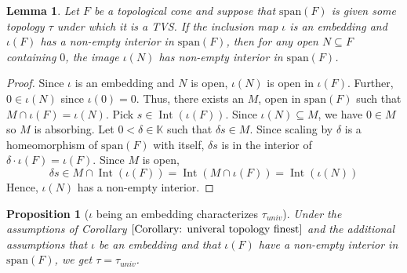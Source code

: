 \documentclass[a4paper,11pt]{article}
\numberwithin{equation}{section}
\theoremstyle{definition}
\theoremstyle{plain}
\newtheorem{Proposition}[Definition]{Proposition}
\newtheorem{Lemma}[Definition]{Lemma}
\newcommand{\spn}{\mathrm{span}}
\DeclareMathOperator{\Int}{Int}
\begin{document}
\begin{Lemma}\label{Lemma: Image has non empty interior}
    Let $F$ be a topological cone and suppose that $\spn(F)$ is given some topology $\tau$ under which it is a TVS. If the inclusion map $\iota$ is an embedding and $\iota(F)$ has a non-empty interior in $\spn(F)$, then for any open $N \subseteq F$ containing $0$, the image $\iota(N)$ has non-empty interior in $\spn(F)$.
\end{Lemma}
\begin{proof}
    Since $\iota$ is an embedding and $N$ is open, $\iota(N)$ is open in $\iota(F)$. Further, $0 \in \iota(N)$ since $\iota(0) = 0$. Thus, there exists an $M$, open in $\spn(F)$ such that $M \cap \iota(F) = \iota(N)$. Pick $s \in \Int(\iota(F))$. Since $\iota(N) \subseteq M$, we have $0 \in M$ so $M$ is absorbing. Let $0 < \delta \in \mathbb{K}$ such that $\delta s \in M$. Since scaling by $\delta$ is a homeomorphism of $\spn(F)$ with itself, $\delta s$ is in the interior of $\delta \cdot \iota(F) = \iota(F)$. Since $M$ is open, 
    \begin{equation*}
        \delta s \in M \cap \Int(\iota(F)) = \Int(M \cap \iota(F)) = \Int(\iota(N))
    \end{equation*}
    Hence, $\iota(N)$ has a non-empty interior.
\end{proof}

\begin{Proposition}[$\iota$ being an embedding characterizes $\tau_{univ}$]
    Under the assumptions of Corollary $\ref{Corollary: univeral topology finest}$ and the additional assumptions that $\iota$ be an embedding and that $\iota(F)$ have a non-empty interior in $\spn(F)$, we get $\tau = \tau_{univ}$.
\end{Proposition}
\end{document}
